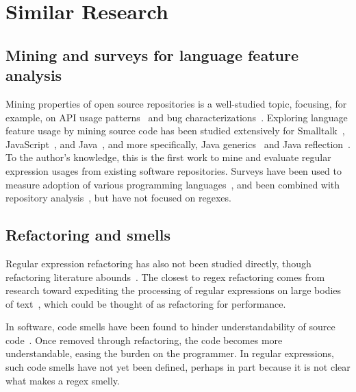 \section{Similar Research}

\subsection{Mining and surveys for language feature analysis}
Mining properties of open source repositories is a well-studied topic, focusing, for example, on API usage patterns~\cite{Linares-Vasquez:2014:MEA:2597073.2597085} and bug characterizations~\cite{Chen:2014:ESD:2597073.2597108}.
Exploring language feature usage by mining source code has been studied extensively for
Smalltalk~\cite{Callau:2011:DUD:1985441.1985448, Callau:2013:DUD:2589712.2589718},
JavaScript~\cite{Richards:2010:ADB:1809028.1806598},
and Java~\cite{Dyer:2014:MBA:2568225.2568295, Grechanik:2010:EIL:1852786.1852801, Parnin:2013:AUJ:2589712.2589717, Livshits:2005:RAJ:2099708.2099724},
and more specifically,
Java generics~\cite{Parnin:2013:AUJ:2589712.2589717} and
Java reflection~\cite{Livshits:2005:RAJ:2099708.2099724}.
To the author's knowledge, this is the first work to mine and evaluate regular expression usages from existing software repositories.
Surveys have been used to measure adoption of various programming languages~\cite{Meyerovich:2013:EAP:2509136.2509515, Dattero:2004:PLG:962081.962087}, and been combined with  repository analysis~\cite{Meyerovich:2013:EAP:2509136.2509515}, but have not focused on regexes.

\subsection{Refactoring and smells}
Regular expression refactoring has also not been studied directly, though refactoring literature abounds~\cite{Mens:2004:SSR:972215.972286, Opdyke:1992:ROF:169783, Griswold:1993:AAP:152388.152389}.
The closest to regex refactoring comes from research toward  expediting the processing of regular expressions on large bodies of text~\cite{Baeza-Yates:1996:FTS:235809.235810}, which could be thought of as refactoring for performance.

In software, code smells have been found to hinder understandability of source code~\cite{abbes2011empirical, du2006does, Hermans2016}.
Once removed through refactoring, the code becomes more understandable, easing the burden on the programmer.
In regular expressions, such code smells have not yet been defined, perhaps in part because it is not clear what makes a regex smelly.

